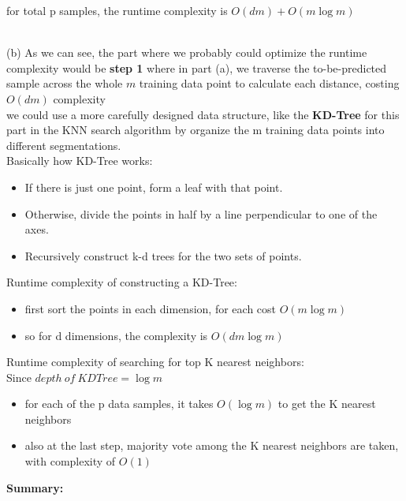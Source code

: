 \documentclass[11pt]{article}
\providecommand{\tightlist}{%
      \setlength{\itemsep}{0pt}\setlength{\parskip}{0pt}}
\begin{document}
for total p samples, the runtime complexity is \(O(dm) + O(m \log m)\)\\\

\noindent (b)
    As we can see, the part where we probably could optimize the runtime
    complexity would be \textbf{step 1} where in part (a), we traverse
    the to-be-predicted sample across the whole \(m\) training data
    point to calculate each distance, costing \(O(dm)\) complexity\\

\noindent we could use a more carefully designed data structure, like the
\textbf{KD-Tree} for this part in the KNN search algorithm by organize
the m training data points into different segmentations.\\

\noindent Basically how KD-Tree works:

\begin{itemize}
\item
  If there is just one point, form a leaf with that point.
\item
  Otherwise, divide the points in half by a line perpendicular to one of
  the axes.
\item
  Recursively construct k-d trees for the two sets of points.
\end{itemize}

\noindent Runtime complexity of constructing a KD-Tree:

\begin{itemize}
\tightlist
\item
  first sort the points in each dimension, for each cost \(O(m \log m)\)
\item
  so for d dimensions, the complexity is \(O(d m \log m)\)
\end{itemize}

 \noindent Runtime complexity of searching for top K nearest neighbors:\\

Since \(depth \: of \: KDTree = \log m\)

\begin{itemize}
\tightlist
\item
  for each of the p data samples, it takes \(O( \log m)\) to get the K
  nearest neighbors
\item
  also at the last step, majority vote among the K nearest neighbors are
  taken, with complexity of \(O(1)\)
\end{itemize}

\noindent \textbf{Summary: }
\end{document}
